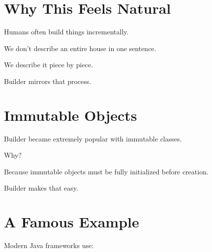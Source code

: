\documentclass[11pt,a4paper]{book}
\begin{document}

\section{Why This Feels Natural}

Humans often build things
incrementally.


We don't describe an entire
house in one sentence.


We describe it piece by piece.


Builder mirrors that process.


\section{Immutable Objects}

Builder became extremely popular
with immutable classes.


Why?


Because immutable objects
must be fully initialized
before creation.


Builder makes that easy.


\section{A Famous Example}

Modern Java frameworks use:
\end{document}
